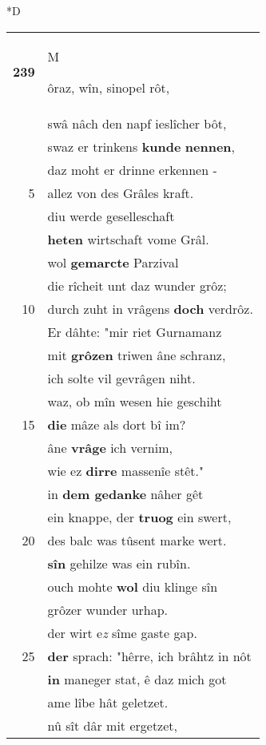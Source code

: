 \documentclass[8pt,a4paper,notitlepage]{article}
\begin{document}
\begin{table}[ht]
\begin{minipage}[t]{0.5\linewidth}
\small
\begin{center}*D
\end{center}
\begin{tabular}{rl}
\textbf{239} & \begin{large}M\end{large}ôraz, wîn, sinopel rôt,\\ 
 & swâ nâch den napf ieslîcher bôt,\\ 
 & swaz er trinkens \textbf{kunde} \textbf{nennen},\\ 
 & daz moht er drinne erkennen -\\ 
5 & allez von des Grâles kraft.\\ 
 & diu werde geselleschaft\\ 
 & \textbf{heten} wirtschaft vome Grâl.\\ 
 & wol \textbf{gemarcte} Parzival\\ 
 & die rîcheit unt daz wunder grôz;\\ 
10 & durch zuht in vrâgens \textbf{doch} verdrôz.\\ 
 & Er dâhte: "mir riet Gurnamanz\\ 
 & mit \textbf{grôzen} triwen âne schranz,\\ 
 & ich solte vil gevrâgen niht.\\ 
 & waz, ob mîn wesen hie geschiht\\ 
15 & \textbf{die} mâze als dort bî im?\\ 
 & âne \textbf{vrâge} ich vernim,\\ 
 & wie ez \textbf{dirre} massenîe stêt."\\ 
 & in \textbf{dem gedanke} nâher gêt\\ 
 & ein knappe, der \textbf{truog} ein swert,\\ 
20 & des balc was tûsent marke wert.\\ 
 & \textbf{sîn} gehilze was ein rubîn.\\ 
 & ouch mohte \textbf{wol} diu klinge sîn\\ 
 & grôzer wunder urhap.\\ 
 & der wirt e\textit{z} sîme gaste gap.\\ 
25 & \textbf{der} sprach: "hêrre, ich brâhtz in nôt\\ 
 & \textbf{in} maneger stat, ê daz mich got\\ 
 & ame lîbe hât geletzet.\\ 
 & nû sît dâr mit ergetzet,\\ 

\end{tabular}
\end{minipage}
\end{table}
\end{document}
